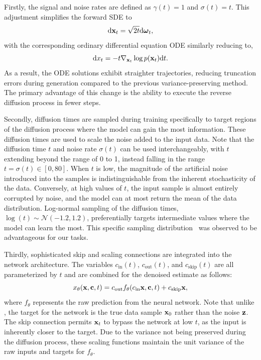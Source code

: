 Firstly, the signal and noise rates are defined as $\gamma(t)=1$ and $\sigma(t)=t$.
This adjustment simplifies the forward SDE to
\begin{equation}
    \mathrm{d} \mathbf{x}_t = \sqrt{2t} \mathrm{d} \boldsymbol{\omega}_t,
\end{equation}
with the corresponding ordinary differential equation ODE similarly reducing to,
\begin{equation}
    \mathrm{d} x_t = - t \nabla_{\mathbf{x}_t} \log p(\mathbf{x}_t) \mathrm{d} t.
\end{equation}
As a result, the ODE solutions exhibit straighter trajectories, reducing truncation errors during generation compared to the previous variance-preserving method.
The primary advantage of this change is the ability to execute the reverse diffusion process in fewer steps.

Secondly, diffusion times are sampled during training specifically to target regions of the diffusion process where the model can gain the most information.
These diffusion times are used to scale the noise added to the input data.
Note that the diffusion time $t$ and noise rate $\sigma(t)$ can be used interchangeably, with $t$ extending beyond the range of 0 to 1, instead falling in the range $t = \sigma(t) \in [0, 80]$.
When $t$ is low, the magnitude of the artificial noise introduced into the samples is indistinguishable from the inherent stochasticity of the data.
Conversely, at high values of $t$, the input sample is almost entirely corrupted by noise, and the model can at most return the mean of the data distribution.
Log-normal sampling of the diffusion times, ${\log(t)\sim\mathcal{N}\left(-1.2, 1.2\right)}$, preferentially targets intermediate values where the model can learn the most.
This specific sampling distribution~\cite{ElucidatingDesignSpace} was observed to be advantageous for our tasks.

Thirdly, sophisticated skip and scaling connections are integrated into the network architecture.
The variables $c_\mathrm{in}(t)$, $c_\mathrm{out}(t)$, and $c_\mathrm{skip}(t)$ are all parameterized by $t$ and are combined for the denoised estimate as follows:
\begin{equation}
    x_\theta(\mathbf{x}, \mathbf{c}, t) = c_\mathrm{out} f_\theta(c_\mathrm{in}\mathbf{x}, \mathbf{c}, t) + c_\mathrm{skip}\mathbf{x},
\end{equation}
where $f_\theta$ represents the raw prediction from the neural network.
Note that unlike \pcjedi, the target for the network is the true data sample $\mathbf{x}_0$ rather than the noise $\mathbf{z}$.
The skip connection permits $\mathbf{x}_t$ to bypass the network at low $t$, as the input is inherently closer to the target.
Due to the variance not being preserved during the diffusion process, these  scaling functions maintain the unit variance of the raw inputs and targets
for $f_\theta$.

